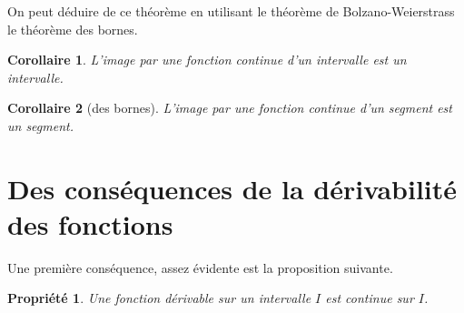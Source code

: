 \documentclass[12pt,a4paper,french]{article}
\theoremstyle{break}
\newtheorem{propriete}{Propriété}
\newtheorem{corollaire}{Corollaire}
\theoremstyle{plain}
\theoremstyle{nonumberplain}
\theoremstyle{nonumberbreak}
\begin{document}
On peut déduire de ce théorème en utilisant le théorème de
Bolzano-Weierstrass le théorème des bornes.

\begin{corollaire}
  L'image par une fonction continue d'un intervalle est un intervalle.
\end{corollaire}

\begin{corollaire}[des bornes]
  L'image par une fonction continue d'un segment est un segment.
\end{corollaire}

\section{Des conséquences de la dérivabilité des fonctions}

Une première conséquence, assez évidente est la proposition suivante.

\begin{propriete}
  Une fonction dérivable sur un intervalle $I$ est continue sur $I$.
\end{propriete}
\end{document}
